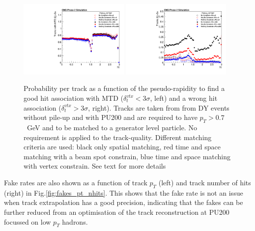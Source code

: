 \begin{figure}[!hbtp]
\centering
\includegraphics[width=0.48\textwidth]{fig/performance/goodTracks_vs_eta_fullComp.pdf}
\includegraphics[width=0.48\textwidth]{fig/performance/fakes_vs_eta_fullComp.pdf}
\caption{Probability per track as a function of the pseudo-rapidity to find a good hit association with MTD ($\delta_{t}^{vtx}<3\sigma$, left) and a wrong hit association ($\delta_{t}^{vtx}>3\sigma$, right). Tracks are taken from  from DY events without pile-up and with PU200 and are required to have $p_{T}>0.7$~GeV and to be matched to a generator level particle. No requirement is applied to the track-quality. Different matching criteria are used: black only spatial matching, red time and space matching with a beam spot constrain, blue time and space matching with vertex constrain. See text for more details}
\label{fig:fakes}
\end{figure}

Fake rates are also shown as a function of track $p_{T}$ (left) and track number of hits (right) in Fig.\ref{fig:fakes_pt_nhits}. This shows that the fake rate is not an issue when track extrapolation has a good precision, indicating that the fakes can be further reduced from an optimisation of the track reconstruction at PU200 focussed on low $p_{T}$ hadrons. 

